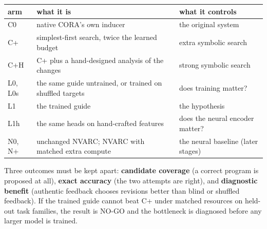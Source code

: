 \documentclass[11pt, a4paper]{article}
\begin{document}
\begin{center}
\begin{tabularx}{\linewidth}{lYY}
arm & what it is & what it controls\\[0pt]
\hline
C0 & native CORA's own inducer & the original system\\[0pt]
C+ & simplest-first search, twice the learned budget & extra symbolic search\\[0pt]
C+H & C+ plus a hand-designed analysis of the changes & strong symbolic search\\[0pt]
L0, L0s & the same guide untrained, or trained on shuffled targets & does training matter?\\[0pt]
L1 & the trained guide & the hypothesis\\[0pt]
L1h & the same heads on hand-crafted features & does the neural encoder matter?\\[0pt]
N0, N+ & unchanged NVARC; NVARC with matched extra compute & the neural baseline (later stages)\\[0pt]
\end{tabularx}
\end{center}

Three outcomes must be kept apart: \textbf{candidate coverage} (a correct program is proposed at all), \textbf{exact accuracy} (the two
attempts are right), and \textbf{diagnostic benefit} (authentic feedback chooses revisions better than blind or shuffled
feedback). If the trained guide cannot beat C+ under matched resources on held-out task families, the result is NO-GO
and the bottleneck is diagnosed before any larger model is trained.
\end{document}
